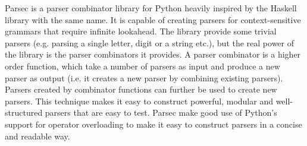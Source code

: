 Parsec\cite{parsec} is a parser combinator library for Python heavily inspired by the Haskell library with the same name. It is capable of creating parsers for context-sensitive grammars that require infinite lookahead. The library provide some trivial parsers (e.g. parsing a single letter, digit or a string etc.), but the real power of the library is the parser combinators it provides. A parser combinator is a higher order function, which take a number of parsers as input and produce a new parser as output (i.e. it creates a new parser by combining existing parsers). Parsers created by combinator functions can further be used to create new parsers. This technique makes it easy to construct powerful, modular and well-structured parsers that are easy to test. Parsec make good use of Python's support for operator overloading to make it easy to construct parsers in a concise and readable way.


